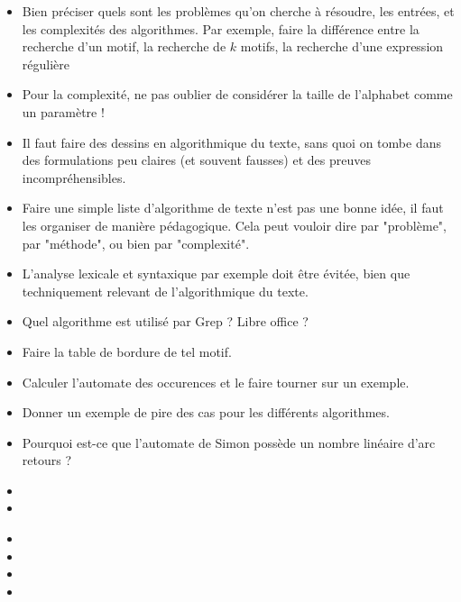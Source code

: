 \documentclass{agregfiche}
\begin{document}
\secpieges

\begin{itemize}
    \item Bien préciser quels sont les problèmes qu'on cherche 
        à résoudre, les entrées, et les complexités des algorithmes.
        Par exemple, faire la différence entre la recherche 
        d'un motif, la recherche de $k$ motifs, la recherche 
        d'une expression régulière 

    \item Pour la complexité, ne pas oublier de 
        considérer la taille de l'alphabet comme un paramètre !

    \item Il faut faire des dessins en algorithmique du texte, sans 
        quoi on tombe dans des formulations peu claires (et souvent 
        fausses) et des preuves incompréhensibles.

    \item Faire une simple liste d'algorithme de texte n'est pas 
        une bonne idée, il faut les organiser de manière pédagogique.
        Cela peut vouloir dire par "problème", par "méthode", ou 
        bien par "complexité".

    \item L'analyse lexicale et syntaxique par exemple doit être évitée, bien que techniquement
        relevant de l'algorithmique du texte.

\end{itemize}

\secquestionsclassiques

\begin{itemize}
    \item Quel algorithme est utilisé par Grep ? Libre office ?
    \item Faire la table de bordure de tel motif.
    \item Calculer l'automate des occurences et le faire tourner sur un exemple.
    \item Donner un exemple de pire des cas pour les différents algorithmes.
    \item Pourquoi est-ce que l'automate de Simon possède un nombre linéaire
        d'arc retours ?
\end{itemize}

\secreferences

\begin{itemize}
\item {}
\item {}
\end{itemize}

\secdev

\begin{itemize}
    \item {}
    \item {}
    \item {}
    \item {}
\end{itemize}
\end{document}
